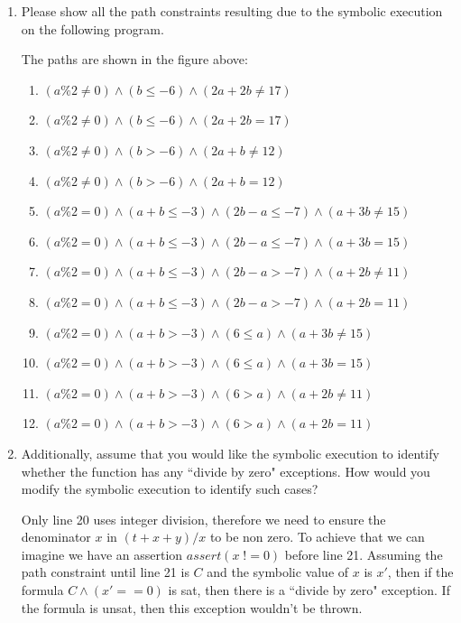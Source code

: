 \documentclass[12pt,a4paper]{article}
\begin{document}
\begin{enumerate}
\begin{enumerate}
\item Please show all the path constraints resulting due to the symbolic execution on the following program.

\color{blue}
The paths are shown in the figure above:

\begin{enumerate}
\item $(a\%2 \neq 0) \wedge (b \leq -6) \wedge (2a + 2b \neq 17)$
\item $(a\%2 \neq 0) \wedge (b \leq -6) \wedge (2a + 2b = 17)$
\item $(a\%2 \neq 0) \wedge (b > -6) \wedge (2a + b \neq 12)$
\item $(a\%2 \neq 0) \wedge (b > -6) \wedge (2a + b = 12)$

\item $(a\%2 = 0) \wedge (a + b \leq -3) \wedge (2b - a \leq -7) \wedge (a + 3b \neq 15)$
\item $(a\%2 = 0) \wedge (a + b \leq -3) \wedge (2b - a \leq -7) \wedge (a + 3b = 15)$
\item $(a\%2 = 0) \wedge (a + b \leq -3) \wedge (2b - a > -7) \wedge (a + 2b \neq 11)$
\item $(a\%2 = 0) \wedge (a + b \leq -3) \wedge (2b - a > -7) \wedge (a + 2b = 11)$

\item $(a\%2 = 0) \wedge (a + b > -3) \wedge (6 \leq a) \wedge (a + 3b \neq 15)$ \label{example}
\item $(a\%2 = 0) \wedge (a + b > -3) \wedge (6 \leq a) \wedge (a + 3b = 15)$
\item $(a\%2 = 0) \wedge (a + b > -3) \wedge (6 > a) \wedge (a + 2b \neq 11)$
\item $(a\%2 = 0) \wedge (a + b > -3) \wedge (6 > a) \wedge (a + 2b = 11)$

\end{enumerate}

\color{black}

\item Additionally, assume that you would like the symbolic execution to identify whether the function has any ``divide by zero" exceptions. How would you modify the symbolic execution to identify such cases?


\color{blue}
Only line 20 uses integer division, therefore we need to ensure the denominator $x$ in $(t+x+y)/x$  to be non zero. To achieve that we can imagine we have an assertion $assert (x \; != 0) $ before line 21. Assuming the path constraint until line 21 is $C$ and the symbolic value of $x$ is $x'$, then if the formula $C \wedge (x' == 0)$ is sat, then there is a ``divide by zero" exception. If the formula is unsat, then this exception wouldn't be thrown. 



\end{enumerate}
\end{enumerate}
\end{document}
